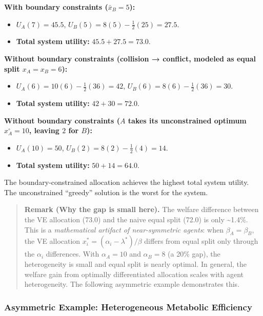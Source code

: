 \documentclass[11pt]{article}
\theoremstyle{plain}
\theoremstyle{definition}
\theoremstyle{remark}
\let\origsubsubsection\subsubsection
\renewcommand{\subsubsection}{\needspace{4\baselineskip}\origsubsubsection}
\providecommand{\tightlist}{%
  \setlength{\itemsep}{0pt}\setlength{\parskip}{0pt}}
\begin{document}
\textbf{With boundary constraints (\(\bar{x}_B = 5\)):}

\begin{itemize}
\tightlist
\item
  \(U_A(7) = 45.5\), \(U_B(5) = 8(5) - \frac{1}{2}(25) = 27.5\).
\item
  \textbf{Total system utility:} \(45.5 + 27.5 = 73.0\).
\end{itemize}

\textbf{Without boundary constraints (collision → conflict, modeled as
equal split \(x_A = x_B = 6\)):}

\begin{itemize}
\tightlist
\item
  \(U_A(6) = 10(6) - \frac{1}{2}(36) = 42\),
  \(U_B(6) = 8(6) - \frac{1}{2}(36) = 30\).
\item
  \textbf{Total system utility:} \(42 + 30 = 72.0\).
\end{itemize}

\textbf{Without boundary constraints (\(A\) takes its unconstrained
optimum \(x_A^{\circ} = 10\), leaving \(2\) for \(B\)):}

\begin{itemize}
\tightlist
\item
  \(U_A(10) = 50\), \(U_B(2) = 8(2) - \frac{1}{2}(4) = 14\).
\item
  \textbf{Total system utility:} \(50 + 14 = 64.0\).
\end{itemize}

The boundary-constrained allocation achieves the highest total system
utility. The unconstrained ``greedy'' solution is the worst for the
system.

\begin{quote}
\textbf{Remark (Why the gap is small here).} The welfare difference
between the VE allocation (73.0) and the naive equal split (72.0) is
only \textasciitilde1.4\%. This is a \emph{mathematical artifact of
near-symmetric agents}: when \(\beta_A = \beta_B\), the VE allocation
\(x_i^* = (\alpha_i - \lambda^*)/\beta\) differs from equal split only
through the \(\alpha_i\) differences. With \(\alpha_A = 10\) and
\(\alpha_B = 8\) (a 20\% gap), the heterogeneity is small and equal
split is nearly optimal. In general, the welfare gain from optimally
differentiated allocation scales with agent heterogeneity. The following
asymmetric example demonstrates this.
\end{quote}

\subsubsection{Asymmetric Example: Heterogeneous Metabolic
Efficiency}\label{asymmetric-example-heterogeneous-metabolic-efficiency}
\end{document}
